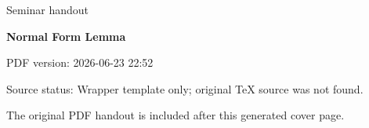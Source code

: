 \documentclass[11pt,a4paper]{article}
\newcommand{\seminartitle}{Normal Form Lemma}
\newcommand{\seminarsubtitle}{Seminar handout}
\newcommand{\seminardate}{2026-06-23 22:52}
\newcommand{\seminarsourcestatus}{Wrapper template only; original TeX source was not found.}
\begin{document}
\begin{titlepage}
\thispagestyle{empty}
\vspace*{0.16\textheight}
{\Large\color{seminarblue}\seminarsubtitle\par}
\vspace{1.5em}
{\LARGE\bfseries \seminartitle\par}
\vspace{2em}
{\large PDF version: \seminardate\par}
\vfill
{\small Source status: \seminarsourcestatus\par}
\vspace{1em}
{\small The original PDF handout is included after this generated cover page.\par}
\end{titlepage}

\clearpage
\hypersetup{pageanchor=false}

\end{document}
